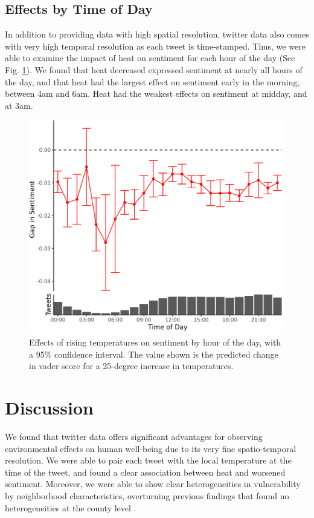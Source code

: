 \documentclass{article}
\begin{document}
\subsection{Effects by Time of Day}

In addition to providing data with high spatial resolution, twitter data also comes with very high temporal resolution as each tweet is time-stamped.  Thus, we were able to examine the impact of heat on sentiment for each hour of the day (See Fig. \ref{fig:ts-wbgt}).  We found that heat decreased expressed sentiment at nearly all hours of the day, and that heat had the largest effect on sentiment early in the morning, between 4am and 6am.  Heat had the weakest effects on sentiment at midday, and at 3am.

\begin{figure}[H]
  \centering
  \includegraphics[width=0.75\linewidth]{../res/ts.png}
  \caption{Effects of rising temperatures on sentiment by hour of the day, with a 95\% confidence interval.  The value shown is the predicted change in vader score for a 25-degree increase in temperatures.}
  \label{fig:ts-wbgt}
\end{figure}

\section{Discussion}
We found that twitter data offers significant advantages for observing environmental effects on human well-being due to its very fine spatio-temporal resolution.  We were able to pair each tweet with the local temperature at the time of the tweet, and found a clear association between heat and worsened sentiment.   Moreover, we were able to show clear heterogeneities in vulnerability by neighborhood characteristics, overturning previous findings that found no heterogeneities at the county level \cite{Burke2018Aug, Mullins2019Dec}.
\end{document}
